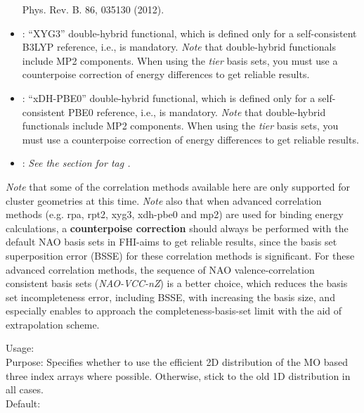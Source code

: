 \begin{itemize}
    Phys. Rev. B. 86, 035130 (2012).
  \item {} : ``XYG3'' double-hybrid functional\cite{Zhang:2009}, which is
    defined only for a self-consistent B3LYP reference, i.e.,
      is mandatory. \emph{Note} that double-hybrid
    functionals include MP2 components. When using the \emph{tier} basis sets,
    you must use a counterpoise correction of energy differences to get 
    reliable results.
  \item {} : ``xDH-PBE0'' double-hybrid functional\cite{Zhang2012}, which is
    defined only for a self-consistent PBE0 reference, i.e.,
      is mandatory. \emph{Note} that double-hybrid
    functionals include MP2 components. When using the \emph{tier} basis sets,
    you must use a counterpoise correction of energy differences to get 
    reliable results.
  \item {} : \emph{See the  section for tag .}
\end{itemize}
\emph{Note} that some of the correlation methods available here are only
supported for cluster geometries at this time. 
\emph{Note} also that when advanced correlation methods (e.g. rpa, rpt2, xyg3, xdh-pbe0 and mp2) are 
used for binding energy calculations, a \textbf{counterpoise correction} should always be
performed with the default NAO basis sets in FHI-aims to get reliable results, 
since the basis set superposition error (BSSE) for these correlation methods is significant.
For these advanced correlation methods, the sequence of NAO valence-correlation consistent 
basis sets (\emph{NAO-VCC-nZ}\cite{Zhang2013}) is a better choice, which reduces the basis set incompleteness error,
including BSSE, with increasing the basis size, and especially enables to approach the completeness-basis-set
limit with the aid of extrapolation scheme.

{
 \noindent
 Usage:   \\[1.0ex]
 Purpose: Specifies whether to use the efficient 2D distribution of the MO
 based three index arrays where possible.  Otherwise, stick to the old 1D
 distribution in all cases.
 \\[1.0ex]
 Default:  \\[1.0ex]
}

